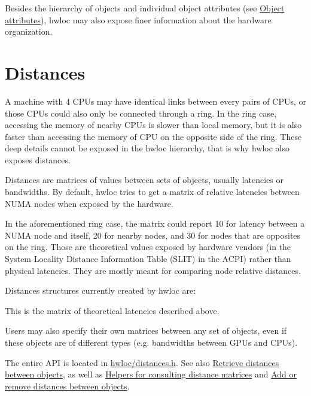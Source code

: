 

Besides the hierarchy of objects and individual object attributes (see \hyperlink{a00386}{Object attributes}), hwloc may also expose finer information about the hardware organization.

 \hypertarget{a00387_topoattrs_distances}{}\section{Distances}\label{a00387_topoattrs_distances}
A machine with 4 C\+P\+Us may have identical links between every pairs of C\+P\+Us, or those C\+P\+Us could also only be connected through a ring. In the ring case, accessing the memory of nearby C\+P\+Us is slower than local memory, but it is also faster than accessing the memory of C\+PU on the opposite side of the ring. These deep details cannot be exposed in the hwloc hierarchy, that is why hwloc also exposes distances.

Distances are matrices of values between sets of objects, usually latencies or bandwidths. By default, hwloc tries to get a matrix of relative latencies between N\+U\+MA nodes when exposed by the hardware.

In the aforementioned ring case, the matrix could report 10 for latency between a N\+U\+MA node and itself, 20 for nearby nodes, and 30 for nodes that are opposites on the ring. Those are theoretical values exposed by hardware vendors (in the System Locality Distance Information Table (S\+L\+IT) in the A\+C\+PI) rather than physical latencies. They are mostly meant for comparing node relative distances.

Distances structures currently created by hwloc are\+: 
\begin{DoxyDescription}
\item[N\+U\+M\+A\+Latency (Linux, Solaris, Free\+B\+SD) ]This is the matrix of theoretical latencies described above.  
\end{DoxyDescription}

Users may also specify their own matrices between any set of objects, even if these objects are of different types (e.\+g. bandwidths between G\+P\+Us and C\+P\+Us).

The entire A\+PI is located in \hyperlink{a00131_source}{hwloc/distances.\+h}. See also \hyperlink{a00208}{Retrieve distances between objects}, as well as \hyperlink{a00209}{Helpers for consulting distance matrices} and \hyperlink{a00210}{Add or remove distances between objects}.

